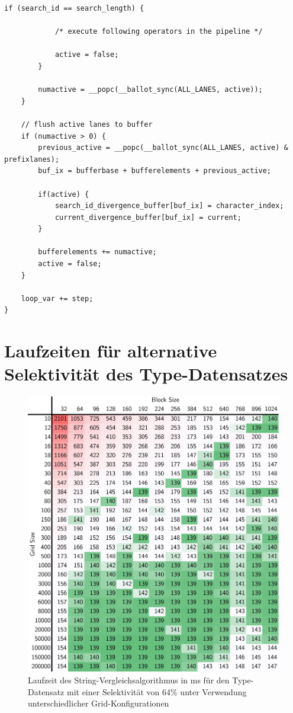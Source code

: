 \begin{lstlisting}[language=MyC++,
caption=Umsetzung der String-Selektion mit Lane Refill]
		if (search_id == search_length) {
		
			/* execute following operators in the pipeline */
		
			active = false;
		}
		
		numactive = __popc(__ballot_sync(ALL_LANES, active));
	}
	
	// flush active lanes to buffer
	if (numactive > 0) {
		previous_active = __popc(__ballot_sync(ALL_LANES, active) & prefixlanes);
		buf_ix = bufferbase + bufferelements + previous_active;
		
		if(active) {
			search_id_divergence_buffer[buf_ix] = character_index;
			current_divergence_buffer[buf_ix] = current;
		}
		
		bufferelements += numactive;
		active = false;
	}
	
	loop_var += step;
}
\end{lstlisting}

\chapter{Laufzeiten für alternative Selektivität des Type-Datensatzes}
\label{apx:parameter64}

\begin{figure}[ht]
	\includegraphics[]{bilder/parameter64.pdf}
	\caption{Laufzeit des String-Vergleichsalgorithmus in ms für den Type-Datensatz mit einer Selektivität von 64\% unter Verwendung unterschiedlicher Grid-Konfigurationen}
\end{figure}